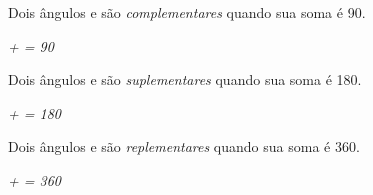 \begin{caixa}
\begin{tdefinicao}
Dois ângulos  e  são \textit{complementares} quando sua soma é 90\degree .

\textit{ +  = 90\degree }
\end{tdefinicao}

\begin{tdefinicao}
Dois ângulos  e  são \textit{suplementares} quando sua soma é 180\degree .

\textit{ +  = 180\degree}
\end{tdefinicao}

\begin{tdefinicao}
Dois ângulos  e  são \textit{replementares} quando sua soma é 360\degree .

\textit{ +  = 360\degree  }
\end{tdefinicao}

\end{caixa}

